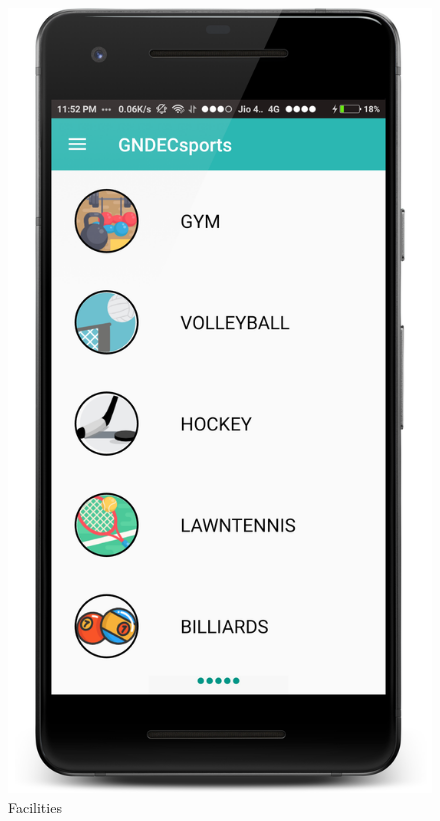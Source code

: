 \begin{figure}[ht]
\centering
\includegraphics[scale=0.20]{images/S3.png}
\caption{Facilities}
\end{figure}

\newpage

